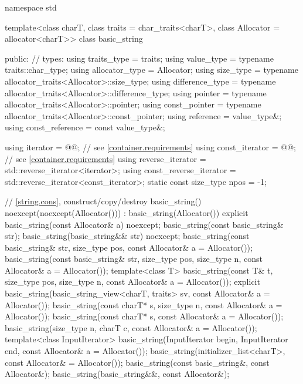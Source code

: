 %
\begin{codeblock}
namespace std {
  template<class charT, class traits = char_traits<charT>,
           class Allocator = allocator<charT>>
  class basic_string {
  public:
    // types:
    using traits_type            =          traits;
    using value_type             = typename traits::char_type;
    using allocator_type         = Allocator;
    using size_type              = typename allocator_traits<Allocator>::size_type;
    using difference_type        = typename allocator_traits<Allocator>::difference_type;
    using pointer                = typename allocator_traits<Allocator>::pointer;
    using const_pointer          = typename allocator_traits<Allocator>::const_pointer;
    using reference              = value_type&;
    using const_reference        = const value_type&;

    using iterator               = @@; // see \ref{container.requirements}
    using const_iterator         = @@; // see \ref{container.requirements}
    using reverse_iterator       = std::reverse_iterator<iterator>;
    using const_reverse_iterator = std::reverse_iterator<const_iterator>;
    static const size_type npos  = -1;

    // \ref{string.cons}, construct/copy/destroy
    basic_string() noexcept(noexcept(Allocator())) : basic_string(Allocator()) { }
    explicit basic_string(const Allocator& a) noexcept;
    basic_string(const basic_string& str);
    basic_string(basic_string&& str) noexcept;
    basic_string(const basic_string& str, size_type pos,
                 const Allocator& a = Allocator());
    basic_string(const basic_string& str, size_type pos, size_type n,
                 const Allocator& a = Allocator());
    template<class T>
      basic_string(const T& t, size_type pos, size_type n,
                   const Allocator& a = Allocator());
    explicit basic_string(basic_string_view<charT, traits> sv,
                          const Allocator& a = Allocator());
    basic_string(const charT* s,
                 size_type n, const Allocator& a = Allocator());
    basic_string(const charT* s, const Allocator& a = Allocator());
    basic_string(size_type n, charT c, const Allocator& a = Allocator());
    template<class InputIterator>
      basic_string(InputIterator begin, InputIterator end,
                   const Allocator& a = Allocator());
    basic_string(initializer_list<charT>, const Allocator& = Allocator());
    basic_string(const basic_string&, const Allocator&);
    basic_string(basic_string&&, const Allocator&);

}}
\end{codeblock}
